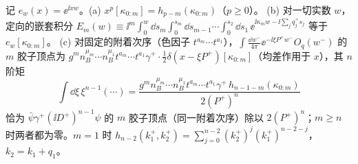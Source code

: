 \begin{lemma}[均差恒等式]\label{lem:appL-divided-differences}
记 $e_w(x)=\ee^{\ii xw}$。(a) $x^p[\kappa_{0:m}]=h_{p-m}(\kappa_{0:m})$（$p\ge0$）。
(b) 对一切实数 $w$，定向的嵌套积分 $E_m(w)\equiv\ii^m\int_0^w\!\dd s_m\int_0^{s_m}\!\dd s_{m-1}\cdots\int_0^{s_2}\!\dd s_1\,\ee^{\ii\kappa_mw-\ii\sum_jq_j^+s_j}$ 等于 $e_w[\kappa_{0:m}]$。
(c) 对固定的附着次序（色因子 $t^{a_m}\cdots t^{a_1}$），$\int\frac{\dd w^-}{4\pi}\ee^{-\ii\xi P^+w^-}O_q(w^-)$ 的 $m$ 胶子顶点为 $g^mn_B^{\mu_m}\cdots n_B^{\mu_1}t^{a_m}\cdots t^{a_1}\gamma^+\cdot\frac12\delta(x-\xi P^+)[\kappa_{0:m}]$（均差作用于 $x$），其 $n$ 阶矩
\begin{equation}\label{eq:appL-vertex}
\int\dd\xi\,\xi^{n-1}(\cdots)=\frac{g^mn_B^{\mu_m}\cdots n_B^{\mu_1}t^{a_m}\cdots t^{a_1}\gamma^+\,h_{n-1-m}(\kappa_{0:m})}{2(P^+)^n}
\end{equation}
恰为 $\bar\psi\gamma^+(\ii D^+)^{n-1}\psi$ 的 $m$ 胶子顶点（同一附着次序）除以 $2(P^+)^n$；$m\ge n$ 时两者都为零。$m=1$ 时 $h_{n-2}(k_1^+,k_2^+)=\sum_{j=0}^{n-2}(k_2^+)^j(k_1^+)^{n-2-j}$，$k_2=k_1+q_1$。
\end{lemma}

